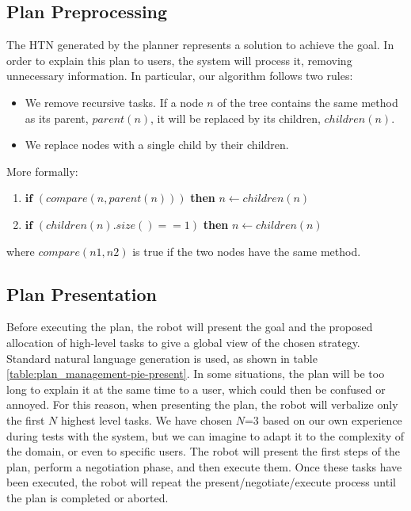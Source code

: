 \subsection{Plan Preprocessing}
The HTN generated by the planner represents a solution to achieve the goal. In order to explain this plan to users, the system will process it, removing unnecessary information. In particular, our algorithm follows two rules:
\begin{itemize}
	\item  We remove recursive tasks. If a node $n$ of the tree contains the same method as its parent, $parent(n)$, it will be replaced by its children, $children(n)$. 
	\item We replace nodes with a single child by their children.
\end{itemize}


More formally:
\begin{enumerate}
\item $\textbf{if}$ $(compare(n, parent(n)))$ \textbf{then} $n \leftarrow children(n)$
\item $\textbf{if}$ $(children(n).size() == 1)$ \textbf{then} $n \leftarrow children(n)$
\end{enumerate}

where $compare(n1,n2)$ is true if the two nodes have the same method.

\subsection{Plan Presentation}
Before executing the plan, the robot will present the goal and the proposed allocation of high-level tasks to give a global view of the chosen strategy. Standard natural language generation is used, as shown in table \ref{table:plan_management-pie-present}. 
In some situations, the plan will be too long to explain it at the same time to a user, which could then be confused or annoyed. For this reason, when presenting the plan, the robot will verbalize only the first $N$  highest level tasks. We have chosen $N$=$3$ based on our own experience during tests with the system, but we can imagine to adapt it to the complexity of the domain, or even to specific users. The robot will present the first steps of the plan, perform a negotiation phase, and then execute them. Once these tasks have been executed, the robot will repeat the present/negotiate/execute process until the plan is completed or aborted.
 
